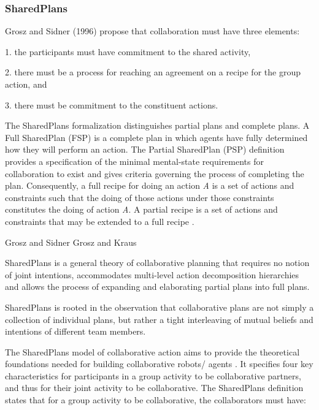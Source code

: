 \documentclass[11pt]{article}
\begin{document}
\cite{grosz:collaborative-systems}

\subsubsection{SharedPlans}

Grosz and Sidner (1996) propose that collaboration must have three elements:

1. the participants must have commitment to the shared activity,

2. there must be a process for reaching an agreement on a recipe for the group
action, and

3. there must be commitment to the constituent actions.

The SharedPlans formalization distinguishes partial plans and complete plans. A
Full SharedPlan (FSP) is a complete plan in which agents have fully determined
how they will perform an action. The Partial SharedPlan (PSP) definition
provides a specification of the minimal mental-state requirements for
collaboration to exist and gives criteria governing the process of completing
the plan. Consequently, a full recipe for doing an action \textit{A} is a set of
actions and constraints such that the doing of those actions under those
constraints constitutes the doing of action \textit{A}. A partial recipe is a
set of actions and constraints that may be extended to a full recipe
\cite{grosz:planning-acting}.

Grosz and Sidner \cite{grosz:plans-discourse}
Grosz and Kraus \cite{grosz:collaboration}

SharedPlans is a general theory of collaborative planning that requires no
notion of joint intentions, accommodates multi-level action decomposition
hierarchies and allows the process of expanding and elaborating partial plans
into full plans.

SharedPlans is rooted in the observation that collaborative plans are not simply
a collection of individual plans, but rather a tight interleaving of mutual
beliefs and intentions of different team members.

The SharedPlans model of collaborative action \cite{grosz:planning-acting}
\cite{grosz:collaboration} \cite{grosz:plans-discourse} aims to provide the
theoretical foundations needed for building collaborative robots/ agents
\cite{grosz:collaborative-systems}. It specifies four key characteristics for
participants in a group activity to be collaborative partners, and thus for
their joint activity to be collaborative. The SharedPlans definition states that
for a group activity to be collaborative, the collaborators must have:
\end{document}
